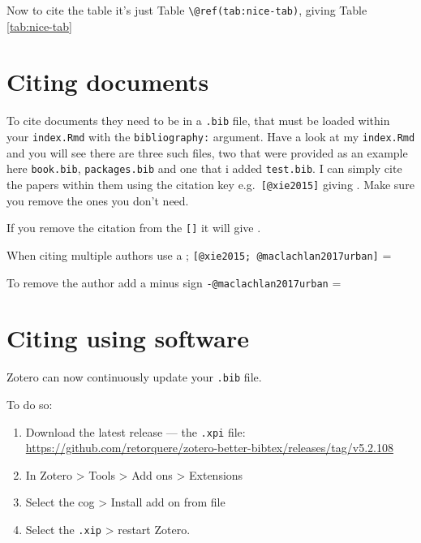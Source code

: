 \documentclass[
  12pt,
  oneside]{book}
\begin{document}
Now to cite the table it's just Table \texttt{\textbackslash{}@ref(tab:nice-tab)}, giving Table \ref{tab:nice-tab}

\hypertarget{citing-documents}{%
\section{Citing documents}\label{citing-documents}}

To cite documents they need to be in a \texttt{.bib} file, that must be loaded within your \texttt{index.Rmd} with the \texttt{bibliography:} argument. Have a look at my \texttt{index.Rmd} and you will see there are three such files, two that were provided as an example here \texttt{book.bib}, \texttt{packages.bib} and one that i added \texttt{test.bib}. I can simply cite the papers within them using the citation key e.g.~\texttt{{[}@xie2015{]}} giving \autocite{xie2015}. Make sure you remove the ones you don't need.

If you remove the citation from the \texttt{{[}{]}} it will give \textcite{xie2015}.

When citing multiple authors use a ; \texttt{{[}@xie2015;\ @maclachlan2017urban{]}} = \autocite{xie2015,maclachlan2017urban}

To remove the author add a minus sign \texttt{-@maclachlan2017urban} = \autocite*{maclachlan2017urban}

\hypertarget{citing-using-software}{%
\section{Citing using software}\label{citing-using-software}}

Zotero can now continuously update your \texttt{.bib} file.

To do so:

\begin{enumerate}
\def\labelenumi{\arabic{enumi}.}
\item
  Download the latest release --- the \texttt{.xpi} file: \url{https://github.com/retorquere/zotero-better-bibtex/releases/tag/v5.2.108}
\item
  In Zotero \textgreater{} Tools \textgreater{} Add ons \textgreater{} Extensions
\item
  Select the cog \textgreater{} Install add on from file
\item
  Select the \texttt{.xip} \textgreater{} restart Zotero.
\end{enumerate}
\end{document}
